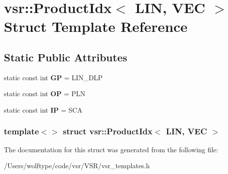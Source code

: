 \hypertarget{structvsr_1_1_product_idx_3_01_l_i_n_00_01_v_e_c_01_4}{\section{vsr\-:\-:Product\-Idx$<$ L\-I\-N, V\-E\-C $>$ Struct Template Reference}
\label{structvsr_1_1_product_idx_3_01_l_i_n_00_01_v_e_c_01_4}
}
\subsection*{Static Public Attributes}
\begin{DoxyCompactItemize}
\item 
\hypertarget{structvsr_1_1_product_idx_3_01_l_i_n_00_01_v_e_c_01_4_a12086f842b817ae2c294448d3c808259}{static const int {\bfseries G\-P} = L\-I\-N\-\_\-\-D\-L\-P}\label{structvsr_1_1_product_idx_3_01_l_i_n_00_01_v_e_c_01_4_a12086f842b817ae2c294448d3c808259}

\item 
\hypertarget{structvsr_1_1_product_idx_3_01_l_i_n_00_01_v_e_c_01_4_af16fc4b40b6d59ff924faec440d4d40a}{static const int {\bfseries O\-P} = P\-L\-N}\label{structvsr_1_1_product_idx_3_01_l_i_n_00_01_v_e_c_01_4_af16fc4b40b6d59ff924faec440d4d40a}

\item 
\hypertarget{structvsr_1_1_product_idx_3_01_l_i_n_00_01_v_e_c_01_4_a3190879a65e54edbb2d8d3027ece955d}{static const int {\bfseries I\-P} = S\-C\-A}\label{structvsr_1_1_product_idx_3_01_l_i_n_00_01_v_e_c_01_4_a3190879a65e54edbb2d8d3027ece955d}

\end{DoxyCompactItemize}
\subsubsection*{template$<$$>$ struct vsr\-::\-Product\-Idx$<$ L\-I\-N, V\-E\-C $>$}



The documentation for this struct was generated from the following file\-:\begin{DoxyCompactItemize}
\item 
/\-Users/wolftype/code/vsr/\-V\-S\-R/vsr\-\_\-templates.\-h\end{DoxyCompactItemize}
